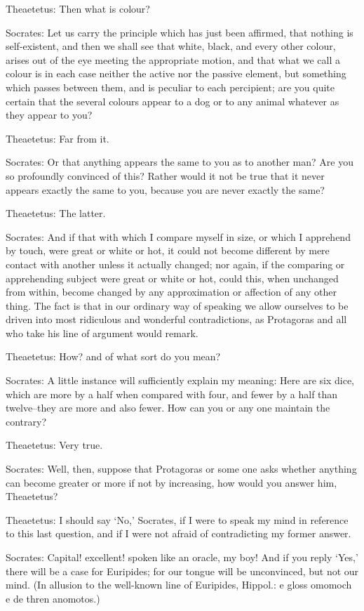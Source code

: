 Theaetetus: Then what is colour?

Socrates: Let us carry the principle which has just been affirmed, that
nothing is self-existent, and then we shall see that white, black,
and every other colour, arises out of the eye meeting the appropriate
motion, and that what we call a colour is in each case neither the
active nor the passive element, but something which passes between
them, and is peculiar to each percipient; are you quite certain that the
several colours appear to a dog or to any animal whatever as they appear
to you?

Theaetetus: Far from it.

Socrates: Or that anything appears the same to you as to another man?
Are you so profoundly convinced of this? Rather would it not be true
that it never appears exactly the same to you, because you are never
exactly the same?

Theaetetus: The latter.

Socrates: And if that with which I compare myself in size, or which
I apprehend by touch, were great or white or hot, it could not become
different by mere contact with another unless it actually changed; nor
again, if the comparing or apprehending subject were great or white
or hot, could this, when unchanged from within, become changed by any
approximation or affection of any other thing. The fact is that in
our ordinary way of speaking we allow ourselves to be driven into most
ridiculous and wonderful contradictions, as Protagoras and all who take
his line of argument would remark.

Theaetetus: How? and of what sort do you mean?

Socrates: A little instance will sufficiently explain my meaning: Here
are six dice, which are more by a half when compared with four, and
fewer by a half than twelve--they are more and also fewer. How can you
or any one maintain the contrary?

Theaetetus: Very true.

Socrates: Well, then, suppose that Protagoras or some one asks whether
anything can become greater or more if not by increasing, how would you
answer him, Theaetetus?

Theaetetus: I should say `No,' Socrates, if I were to speak my mind
in reference to this last question, and if I were not afraid of
contradicting my former answer.

Socrates: Capital! excellent! spoken like an oracle, my boy! And if you
reply `Yes,' there will be a case for Euripides; for our tongue will be
unconvinced, but not our mind. (In allusion to the well-known line of
Euripides, Hippol.: e gloss omomoch e de thren anomotos.)


